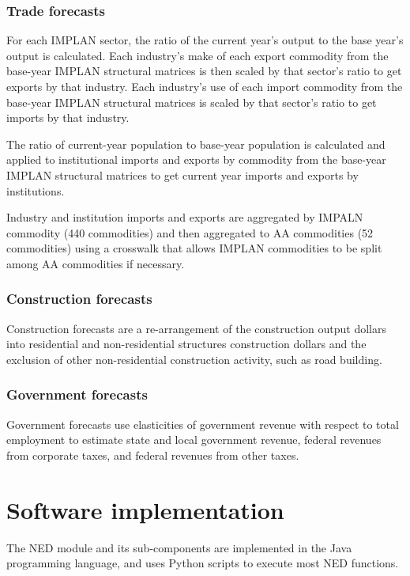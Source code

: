 \subsubsection{Trade forecasts}
For each IMPLAN sector, the ratio of the current year's output to the base year's output is calculated. Each industry's make of each export commodity from the base-year IMPLAN structural matrices is then scaled by that sector's ratio to get exports by that industry. Each industry's use of each import commodity from the base-year IMPLAN structural matrices is scaled by that sector's ratio to get imports by that industry.

The ratio of current-year population to base-year population is calculated and applied to institutional imports and exports by commodity from the base-year IMPLAN structural matrices to get current year imports and exports by institutions.

Industry and institution imports and exports are aggregated by IMPALN commodity (440 commodities) and then aggregated to AA commodities (52 commodities) using a crosswalk that allows IMPLAN commodities to be split among AA commodities if necessary.

\subsubsection{Construction forecasts}
Construction forecasts are a re-arrangement of the construction output dollars into residential and non-residential structures construction dollars and the exclusion of other non-residential construction activity, such as road building.

\subsubsection{Government forecasts}
Government forecasts use elasticities of government revenue with respect to total employment to estimate state and local government revenue, federal revenues from corporate taxes, and federal revenues from other taxes.

\section{Software implementation}
The NED module and its sub-components are implemented in the Java programming language, and uses Python scripts to execute most NED functions.

